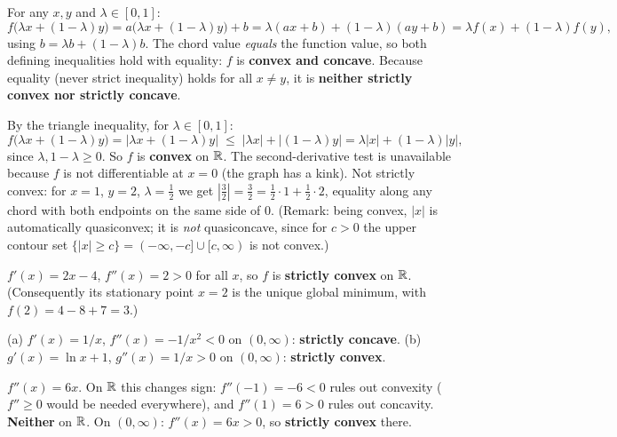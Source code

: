 \begin{solutions}
  \item For any $x,y$ and $\lambda\in[0,1]$:
        \[
          f\bigl(\lambda x+(1-\lambda)y\bigr)
          = a\bigl(\lambda x+(1-\lambda)y\bigr)+b
          = \lambda(ax+b)+(1-\lambda)(ay+b)
          = \lambda f(x)+(1-\lambda)f(y),
        \]
        using $b=\lambda b+(1-\lambda)b$. The chord value \emph{equals}
        the function value, so both defining inequalities hold with
        equality: $f$ is \textbf{convex and concave}. Because equality
        (never strict inequality) holds for all $x\neq y$, it is
        \textbf{neither strictly convex nor strictly concave}.

  \item By the triangle inequality, for $\lambda\in[0,1]$:
        \[
          f\bigl(\lambda x+(1-\lambda)y\bigr)
          = |\lambda x+(1-\lambda)y|
          \;\le\; |\lambda x|+|(1-\lambda)y|
          = \lambda|x|+(1-\lambda)|y| ,
        \]
        since $\lambda,1-\lambda\ge0$. So $f$ is \textbf{convex} on $\mathbb{R}$.
        The second-derivative test is unavailable because $f$ is not
        differentiable at $x=0$ (the graph has a kink). Not strictly
        convex: for $x=1$, $y=2$, $\lambda=\tfrac12$ we get
        $|\tfrac32|=\tfrac32=\tfrac12\cdot1+\tfrac12\cdot2$, equality
        along any chord with both endpoints on the same side of $0$.
        (Remark: being convex, $|x|$ is automatically quasiconvex; it is
        \emph{not} quasiconcave, since for $c>0$ the upper contour set
        $\{|x|\ge c\}=(-\infty,-c]\cup[c,\infty)$ is not convex.)

  \item $f'(x)=2x-4$, $f''(x)=2>0$ for all $x$, so $f$ is
        \textbf{strictly convex} on $\mathbb{R}$. (Consequently its stationary
        point $x=2$ is the unique global minimum, with
        $f(2)=4-8+7=3$.)

  \item (a) $f'(x)=1/x$, $f''(x)=-1/x^{2}<0$ on $(0,\infty)$:
        \textbf{strictly concave}. \;
        (b) $g'(x)=\ln x+1$, $g''(x)=1/x>0$ on $(0,\infty)$:
        \textbf{strictly convex}.

  \item $f''(x)=6x$. On $\mathbb{R}$ this changes sign: $f''(-1)=-6<0$ rules out
        convexity ($f''\ge0$ would be needed everywhere), and $f''(1)=6>0$
        rules out concavity. \textbf{Neither} on $\mathbb{R}$. On $(0,\infty)$:
        $f''(x)=6x>0$, so \textbf{strictly convex} there.


\end{solutions}
